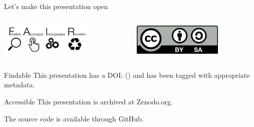 \begin{frame}{Let's make this presentation open}

	\begin{columns}[t]
		\begin{column}{.45\textwidth}
		    \centering
		    \includegraphics[height=1.5cm]{images/1280px-FAIR_data_principles.jpg}

		\end{column}

		\begin{column}{.45\textwidth}
		    \centering
		    \includegraphics[height=1.5cm]{images/cc-by-sa.png}
        \end{column}
	\end{columns}

	\begin{columns}[t]
		\begin{column}{.45\textwidth}
		    \centering
		    \begin{block}{Findable}
			    This presentation has a DOI: %
			    () %
			    and has been tagged with appropriate metadata.
		    \end{block}

		    \begin{block}{Accessible}
			    This presentation is archived at Zenodo.org.
			    
			    The source code is available through GitHub.
		    \end{block}
        \end{column}


\end{columns}
\end{frame}
